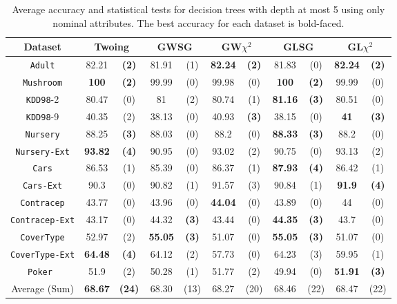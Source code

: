 \begin{table*}[t]
\small
\centering
\caption{Average accuracy and statistical tests  for  decision trees 
with depth at most 5 using only nominal attributes. The best accuracy for each dataset is bold-faced.}
\begin{tabular}{c|cc|cc|cc|cc|cc} 
Dataset &        \multicolumn{2}{c|}{Twoing} &  \multicolumn{2}{c|}{GWSG}  
&   \multicolumn{2}{c|}{GW$\chi^2$}  &    \multicolumn{2}{c|}{GLSG} &   \multicolumn{2}{c}{GL$\chi^2$} \\  \hline   
{\tt Adult}         & 82.21 & {\bf  (2)} & 81.91 & (1) & {\bf  82.24} & {\bf  (2)} & 81.83 & (0) & {\bf  82.24} & {\bf  (2)} \\
{\tt Mushroom}      & {\bf  100}   & {\bf  (2)} & 99.99 & (0) & 99.98 & (0) & {\bf  100}   & {\bf  (2)} & 99.99 & (0) \\
{\tt KDD98}-2       & 80.47 & (0) & 81    & (2) & 80.74 & (1) & {\bf  81.16} & {\bf  (3)} & 80.51 & (0) \\
{\tt KDD98}-9       & 40.35 & (2) & 38.13 & (0) & 40.93 & {\bf  (3)} & 38.15 & (0) & {\bf  41 }   &{\bf   (3) }\\
{\tt Nursery}       & 88.25 & {\bf  (3)} & 88.03 & (0) & 88.2  & (0) & {\bf  88.33} & {\bf  (3)} & 88.2  & (0) \\
{\tt Nursery-Ext}   & {\bf  93.82} & {\bf  (4)} & 90.95 & (0) & 93.02 & (2) & 90.75 & (0) & 93.13 & (2) \\
{\tt Cars}          & 86.53 & (1) & 85.39 & (0) & 86.37 & (1) & {\bf  87.93} & {\bf  (4)} & 86.42 & (1) \\
{\tt Cars-Ext}      & 90.3  & (0) & 90.82 & (1) & 91.57 & (3) & 90.84 & (1) & {\bf  91.9}  & {\bf  (4)} \\
{\tt Contracep}     & 43.77 & (0) & 43.96 & (0) & {\bf  44.04} & (0) & 43.89 & (0) & 44    & (0) \\
{\tt Contracep-Ext} & 43.17 & (0) & 44.32 & {\bf  (3)} & 43.44 & (0) & {\bf  44.35} & {\bf  (3)} & 43.7  & (0) \\
{\tt CoverType}     & 52.97 & (2) & {\bf  55.05} & {\bf  (3)} & 51.07 & (0) & {\bf  55.05} & {\bf  (3)} & 51.07 & (0) \\
{\tt CoverType-Ext} & {\bf  64.48} & {\bf  (4)} & 64.12 & (2) & 57.73 & (0) & 64.23 & (3) & 59.95 & (1) \\ 
{\tt Poker } & 51.9 & (2) &50.28 & (1) & 51.77 & (2) & 49.94 & (0) & {\bf  51.91} & {\bf  (3)} \\ 
\hline
Average (Sum) &             {\bf  68.67}  &  {\bf  (24)}  & 68.30  &  (13)  & 68.27 &  (20)   & 68.46 &  (22)   & 68.47 &  (22) 

\end{tabular}
\label{exp:thirdset}
\normalsize
\end{table*}


